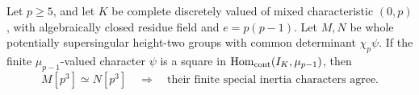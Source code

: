 \begin{proposition}
\label{prop:B-RD77-square}
Let \(p\ge5\), and let \(K\) be complete discretely valued
of mixed characteristic \((0,p)\), with algebraically closed
residue field and \(e=p(p-1)\). Let \(M,N\) be whole
potentially supersingular height-two groups with common
determinant \(\chi_p\psi\). If the finite
\(\mu_{p-1}\)-valued character \(\psi\) is a square in
\(\operatorname{Hom}_{\rm cont}(I_K,\mu_{p-1})\), then
\[
             M[p^3]\simeq N[p^3]
   \quad\Longrightarrow\quad
   \text{their finite special inertia characters agree}.
                                                        \tag{B-RD77.4}
\]
\end{proposition}
